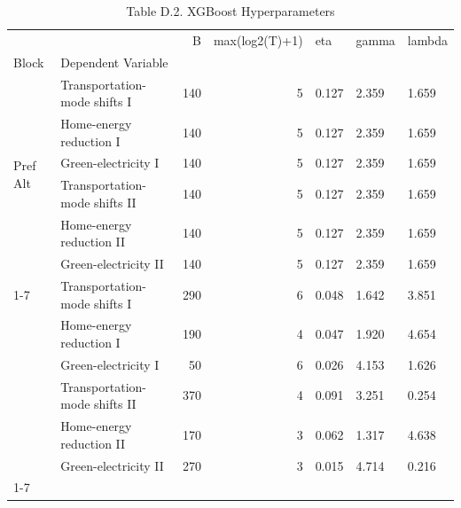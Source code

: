 \begin{table}
\caption{Table D.2. XGBoost Hyperparameters}
\begin{tabular}{llrrlll}
\toprule
 &  & B & max(log2(T)+1) & eta & gamma & lambda \\
Block & Dependent Variable &  &  &  &  &  \\
\midrule
\multirow[t]{6}{*}{Pref Alt} & Transportation-mode shifts I & 140 & 5 & 0.127 & 2.359 & 1.659 \\
 & Home-energy reduction I & 140 & 5 & 0.127 & 2.359 & 1.659 \\
 & Green-electricity I & 140 & 5 & 0.127 & 2.359 & 1.659 \\
 & Transportation-mode shifts II & 140 & 5 & 0.127 & 2.359 & 1.659 \\
 & Home-energy reduction II & 140 & 5 & 0.127 & 2.359 & 1.659 \\
 & Green-electricity II & 140 & 5 & 0.127 & 2.359 & 1.659 \\
\cline{1-7}
\multirow[t]{6}{*}{WTA} & Transportation-mode shifts I & 290 & 6 & 0.048 & 1.642 & 3.851 \\
 & Home-energy reduction I & 190 & 4 & 0.047 & 1.920 & 4.654 \\
 & Green-electricity I & 50 & 6 & 0.026 & 4.153 & 1.626 \\
 & Transportation-mode shifts II & 370 & 4 & 0.091 & 3.251 & 0.254 \\
 & Home-energy reduction II & 170 & 3 & 0.062 & 1.317 & 4.638 \\
 & Green-electricity II & 270 & 3 & 0.015 & 4.714 & 0.216 \\
\cline{1-7}
\bottomrule
\end{tabular}
\end{table}
